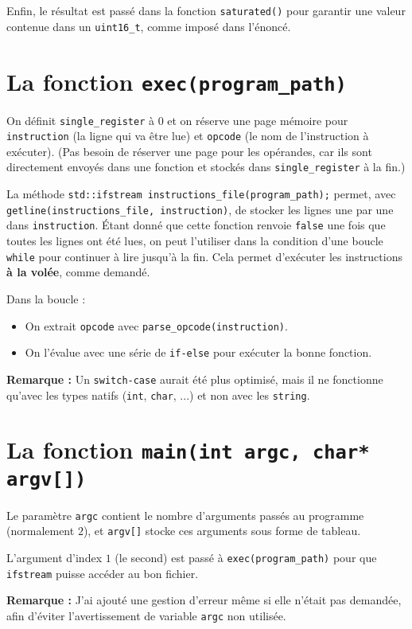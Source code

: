 \documentclass[a4paper,10pt]{article}
\begin{document}
Enfin, le résultat est passé dans la fonction \texttt{saturated()} pour garantir une valeur contenue dans un \texttt{uint16\_t}, comme imposé dans l'énoncé.

\section{La fonction \texttt{exec(program\_path)}}
On définit \texttt{single\_register} à $0$ et on réserve une page mémoire pour \texttt{instruction} (la ligne qui va être lue) et \texttt{opcode} (le nom de l'instruction à exécuter). (Pas besoin de réserver une page pour les opérandes, car ils sont directement envoyés dans une fonction et stockés dans \texttt{single\_register} à la fin.)

La méthode \texttt{std::ifstream instructions\_file(program\_path);} permet, avec \texttt{getline(instructions\_file, instruction)}, de stocker les lignes une par une dans \texttt{instruction}. Étant donné que cette fonction renvoie \texttt{false} une fois que toutes les lignes ont été lues, on peut l'utiliser dans la condition d'une boucle \texttt{while} pour continuer à lire jusqu'à la fin. Cela permet d'exécuter les instructions \textbf{à la volée}, comme demandé.

Dans la boucle :
\begin{itemize}
    \item On extrait \texttt{opcode} avec \texttt{parse\_opcode(instruction)}.
    \item On l'évalue avec une série de \texttt{if-else} pour exécuter la bonne fonction.
\end{itemize}
\textbf{Remarque :} Un \texttt{switch-case} aurait été plus optimisé, mais il ne fonctionne qu'avec les types natifs (\texttt{int}, \texttt{char}, ...) et non avec les \texttt{string}.

\section{La fonction \texttt{main(int argc, char* argv[])}}
Le paramètre \texttt{argc} contient le nombre d'arguments passés au programme (normalement $2$), et \texttt{argv[]} stocke ces arguments sous forme de tableau.

L'argument d'index $1$ (le second) est passé à \texttt{exec(program\_path)} pour que \texttt{ifstream} puisse accéder au bon fichier.

\textbf{Remarque :} J'ai ajouté une gestion d'erreur même si elle n'était pas demandée, afin d'éviter l'avertissement de variable \texttt{argc} non utilisée.
\end{document}
